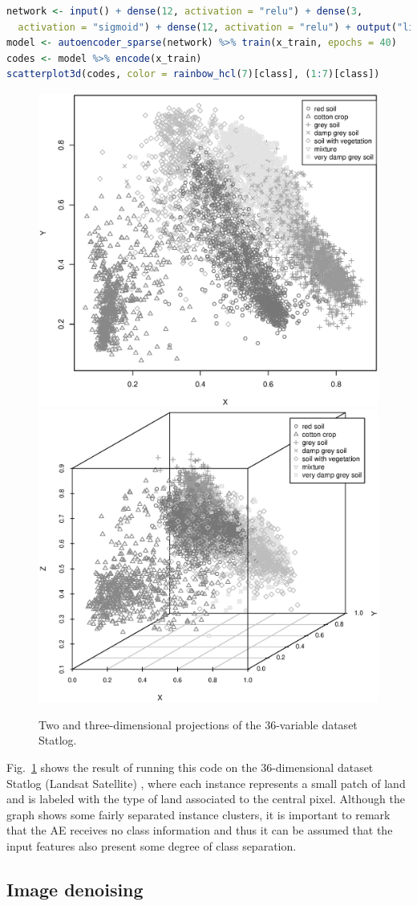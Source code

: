 \begin{lstlisting}[language=R]
network <- input() + dense(12, activation = "relu") + dense(3, 
  activation = "sigmoid") + dense(12, activation = "relu") + output("linear")
model <- autoencoder_sparse(network) %>% train(x_train, epochs = 40)
codes <- model %>% encode(x_train)
scatterplot3d(codes, color = rainbow_hcl(7)[class], (1:7)[class])
\end{lstlisting}

\begin{figure}[ht]
    \centering
    \includegraphics[width=.49\textwidth]{visualization_sat2.eps}
    \includegraphics[width=.49\textwidth]{visualization_sat3.eps}
    \caption{Two and three-dimensional projections of the 36-variable dataset Statlog.}
    \label{p4fig:visualization}
\end{figure}

Fig.~\ref{p4fig:visualization} shows the result of running this code on the 36-dimensional dataset Statlog (Landsat Satellite) \cite{ucirepo}, 
where each instance represents a small patch of land and is labeled with the type of land associated to the central pixel. Although the graph shows some fairly separated instance clusters, it is important to remark that the AE receives no class information and thus it can be assumed that the input features also present some degree of class separation.


\subsection{Image denoising}
\label{p4sec.denoising}

